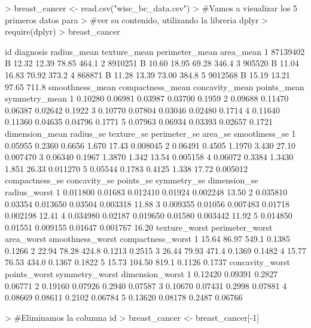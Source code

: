 \documentclass [a4paper] {article}
\begin{document}
\footnotesize{
\begin{Schunk}
\begin{Sinput}
>   breast_cancer <- read.csv("wisc_bc_data.csv")
>   #Vamos a visualizar los 5 primeros datos para
>   #ver su contenido, utilizando la libreria dplyr
>   require(dplyr)
>   breast_cancer %>% head(5)
\end{Sinput}
\begin{Soutput}
        id diagnosis radius_mean texture_mean perimeter_mean area_mean
1 87139402         B       12.32        12.39          78.85     464.1
2  8910251         B       10.60        18.95          69.28     346.4
3   905520         B       11.04        16.83          70.92     373.2
4   868871         B       11.28        13.39          73.00     384.8
5  9012568         B       15.19        13.21          97.65     711.8
  smoothness_mean compactness_mean concavity_mean points_mean symmetry_mean
1         0.10280          0.06981        0.03987     0.03700        0.1959
2         0.09688          0.11470        0.06387     0.02642        0.1922
3         0.10770          0.07804        0.03046     0.02480        0.1714
4         0.11640          0.11360        0.04635     0.04796        0.1771
5         0.07963          0.06934        0.03393     0.02657        0.1721
  dimension_mean radius_se texture_se perimeter_se area_se smoothness_se
1        0.05955    0.2360     0.6656        1.670   17.43      0.008045
2        0.06491    0.4505     1.1970        3.430   27.10      0.007470
3        0.06340    0.1967     1.3870        1.342   13.54      0.005158
4        0.06072    0.3384     1.3430        1.851   26.33      0.011270
5        0.05544    0.1783     0.4125        1.338   17.72      0.005012
  compactness_se concavity_se points_se symmetry_se dimension_se radius_worst
1       0.011800      0.01683  0.012410     0.01924     0.002248        13.50
2       0.035810      0.03354  0.013650     0.03504     0.003318        11.88
3       0.009355      0.01056  0.007483     0.01718     0.002198        12.41
4       0.034980      0.02187  0.019650     0.01580     0.003442        11.92
5       0.014850      0.01551  0.009155     0.01647     0.001767        16.20
  texture_worst perimeter_worst area_worst smoothness_worst compactness_worst
1         15.64           86.97      549.1           0.1385            0.1266
2         22.94           78.28      424.8           0.1213            0.2515
3         26.44           79.93      471.4           0.1369            0.1482
4         15.77           76.53      434.0           0.1367            0.1822
5         15.73          104.50      819.1           0.1126            0.1737
  concavity_worst points_worst symmetry_worst dimension_worst
1         0.12420      0.09391         0.2827         0.06771
2         0.19160      0.07926         0.2940         0.07587
3         0.10670      0.07431         0.2998         0.07881
4         0.08669      0.08611         0.2102         0.06784
5         0.13620      0.08178         0.2487         0.06766
\end{Soutput}
\begin{Sinput}
>   #Eliminamos la columna id
>   breast_cancer <- breast_cancer[-1]
\end{Sinput}
\end{Schunk}
}
\end{document}
